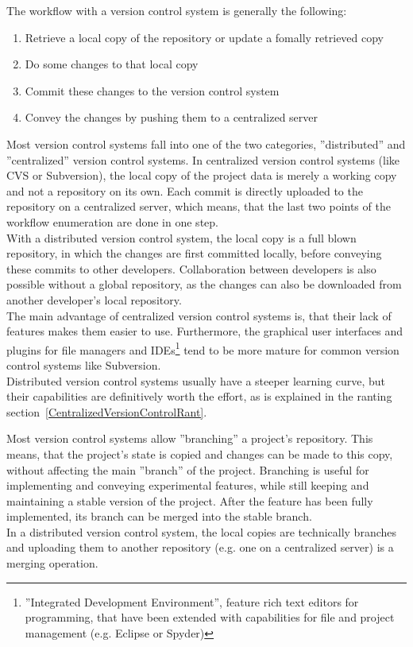 		The workflow with a version control system is generally the following:
		\begin{enumerate}
			\item Retrieve a local copy of the repository or update a fomally retrieved copy
			\item Do some changes to that local copy
			\item Commit these changes to the version control system
			\item Convey the changes by pushing them to a centralized server
		\end{enumerate}

		Most version control systems fall into one of the two categories, ''distributed'' and ''centralized'' version control systems.
		In centralized version control systems (like CVS or Subversion), the local copy of the project data is merely a working copy and not a repository on its own.
		Each commit is directly uploaded to the repository on a centralized server, which means, that the last two points of the workflow enumeration are done in one step.\\
		With a distributed version control system, the local copy is a full blown repository, in which the changes are first committed locally, before conveying these commits to other developers.
		Collaboration between developers is also possible without a global repository, as the changes can also be downloaded from another developer's local repository.\\
		The main advantage of centralized version control systems is, that their lack of features makes them easier to use.
		Furthermore, the graphical user interfaces and plugins for file managers and IDEs\footnote{''Integrated Development Environment'', feature rich text editors for programming, that have been extended with capabilities for file and project management (e.g. Eclipse or Spyder)} tend to be more mature for common version control systems like Subversion.\\
		Distributed version control systems usually have a steeper learning curve, but their capabilities are definitively worth the effort, as is explained in the ranting section~\ref{CentralizedVersionControlRant}.

		Most version control systems allow ''branching'' a project's repository.
		This means, that the project's state is copied and changes can be made to this copy, without affecting the main ''branch'' of the project.
		Branching is useful for implementing and conveying experimental features, while still keeping and maintaining a stable version of the project.
		After the feature has been fully implemented, its branch can be merged into the stable branch.\\
		In a distributed version control system, the local copies are technically branches and uploading them to another repository (e.g. one on a centralized server) is a merging operation.

